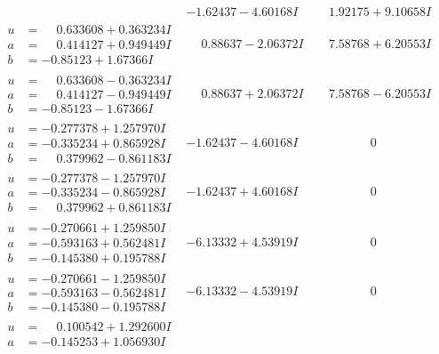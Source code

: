 \documentclass[1p]{elsarticle_modified}
\theoremstyle{definition}
\begin{document}
$$\begin{array}{c|c|c}
 & -1.62437 - 4.60168 I & \phantom{-}1.92175 + 9.10658 I \\ \hline\begin{aligned}
u &= \phantom{-}0.633608 + 0.363234 I \\
a &= \phantom{-}0.414127 + 0.949449 I \\
b &= -0.85123 + 1.67366 I\end{aligned}
 & \phantom{-}0.88637 - 2.06372 I & \phantom{-}7.58768 + 6.20553 I \\ \hline\begin{aligned}
u &= \phantom{-}0.633608 - 0.363234 I \\
a &= \phantom{-}0.414127 - 0.949449 I \\
b &= -0.85123 - 1.67366 I\end{aligned}
 & \phantom{-}0.88637 + 2.06372 I & \phantom{-}7.58768 - 6.20553 I \\ \hline\begin{aligned}
u &= -0.277378 + 1.257970 I \\
a &= -0.335234 + 0.865928 I \\
b &= \phantom{-}0.379962 - 0.861183 I\end{aligned}
 & -1.62437 - 4.60168 I & \phantom{-0.000000 } 0 \\ \hline\begin{aligned}
u &= -0.277378 - 1.257970 I \\
a &= -0.335234 - 0.865928 I \\
b &= \phantom{-}0.379962 + 0.861183 I\end{aligned}
 & -1.62437 + 4.60168 I & \phantom{-0.000000 } 0 \\ \hline\begin{aligned}
u &= -0.270661 + 1.259850 I \\
a &= -0.593163 + 0.562481 I \\
b &= -0.145380 + 0.195788 I\end{aligned}
 & -6.13332 + 4.53919 I & \phantom{-0.000000 } 0 \\ \hline\begin{aligned}
u &= -0.270661 - 1.259850 I \\
a &= -0.593163 - 0.562481 I \\
b &= -0.145380 - 0.195788 I\end{aligned}
 & -6.13332 - 4.53919 I & \phantom{-0.000000 } 0 \\ \hline\begin{aligned}
u &= \phantom{-}0.100542 + 1.292600 I \\
a &= -0.145253 + 1.056930 I \\

\end{aligned}
\end{array}$$
\end{document}

